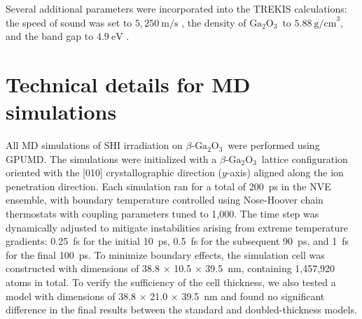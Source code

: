 \documentclass[%
reprint,
superscriptaddress,
 amsmath,amssymb,
 aps,
]{revtex4-2}
\newcommand{\ga}{$\text{Ga}_2\text{O}_3$}
\begin{document}
Several additional parameters were incorporated into the TREKIS calculations: 
the speed of sound was set to $5,250~\mathrm{m/s}$ \cite{wright_acoustic_2025}, the density 
of \ga\ to $5.88~\mathrm{g/cm}^3$, and the band gap to 
$4.9~\mathrm{eV}$ \cite{zhang_tight-binding_2022}.

\section{Technical details for MD simulations}
\label{app:md}
All MD simulations of SHI irradiation on $\beta$-\ga\ were performed using GPUMD. 
The simulations were initialized with a $\beta$-\ga\ lattice configuration oriented with the 
[010] crystallographic direction ($y$-axis) aligned along the ion penetration direction. 
Each simulation ran for a total of 200~ps in the NVE ensemble, with boundary temperature 
controlled using Nose-Hoover chain thermostats with coupling parameters tuned to 1,000. 
The time step was dynamically adjusted to mitigate instabilities arising from extreme 
temperature gradients: 0.25~fs for the initial 10~ps, 0.5~fs for the subsequent 90~ps, 
and 1~fs for the final 100~ps. 
To minimize boundary effects, the simulation cell was constructed with dimensions of 
38.8 $\times$ 10.5 $\times$ 39.5~nm, containing 1,457,920 atoms in total. 
To verify the sufficiency of the cell thickness, we also tested a model with dimensions of 
38.8 $\times$ 21.0 $\times$ 39.5~nm and found no significant difference in the final 
results between the standard and doubled-thickness models. 


\end{document}
